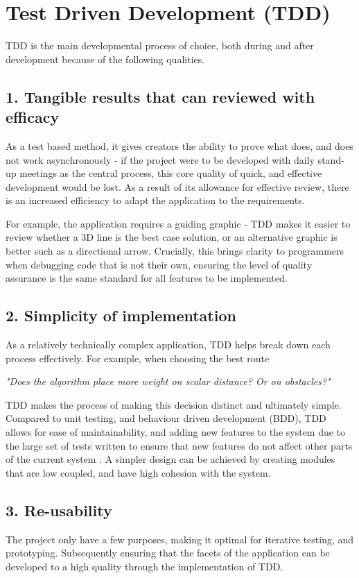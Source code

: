 
{
\section{Test Driven Development (TDD)}
TDD is the main developmental process of choice, both during and after development because of the following qualities. 

\subsection*{1. Tangible results that can reviewed with efficacy}
As a test based method, it gives creators the ability to prove what does, and does not work asynchronously - if the project were to be developed with daily stand-up meetings as the central process, this core quality of quick, and effective development would be lost. As a result of its allowance for effective review, there is an increased efficiency to adapt the application to the requirements. 

For example, the application requires a guiding graphic - TDD makes it easier to review whether a 3D line is the best case solution, or an alternative graphic is better such as a directional arrow. Crucially, this brings clarity to programmers when debugging code that is not their own, ensuring the level of quality assurance is the same standard for all features to be implemented.

\subsection*{2. Simplicity of implementation}
As a relatively technically complex application, TDD helps break down each process effectively. For example, when choosing the best route 

\begin{displayquote}
\textit{"Does the algorithm place more weight on scalar distance? Or on obstacles?"}
\end{displayquote}

TDD makes the process of making this decision distinct and ultimately simple. Compared to unit testing, and behaviour driven development (BDD), TDD allows for ease of maintainability, and adding new features to the system due to the large set of tests written to ensure that new features do not affect other parts of the current system \cite{codeutopia}. A simpler design can be achieved by creating modules that are low coupled, and have high cohesion with the system.

\subsection*{3. Re-usability}
The project only have a few purposes, making it optimal for iterative testing, and prototyping. Subsequently ensuring that the facets of the application can be developed to a high quality through the implementation of TDD.

}